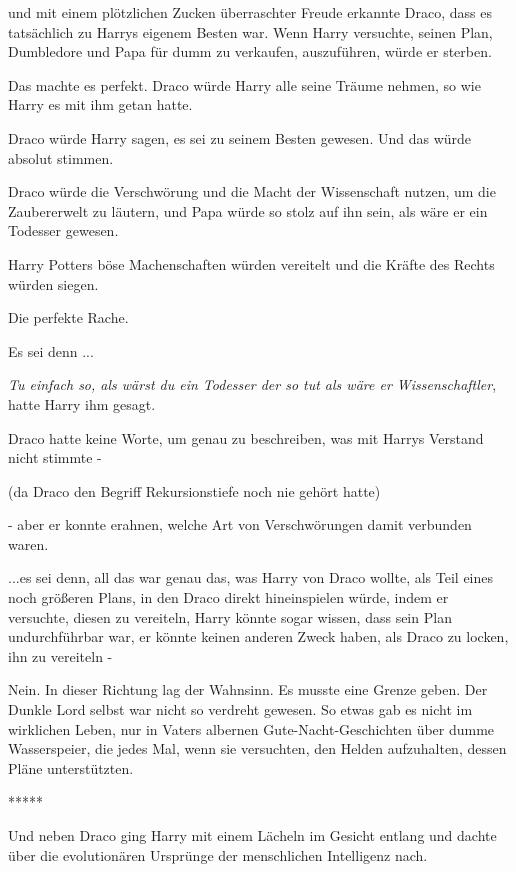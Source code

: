 und mit einem plötzlichen Zucken überraschter Freude erkannte Draco, dass es
tatsächlich zu Harrys eigenem Besten war. Wenn Harry versuchte, seinen Plan,
Dumbledore und Papa für dumm zu verkaufen, auszuführen, würde er sterben.

Das machte es perfekt. Draco würde Harry alle seine Träume nehmen, so wie Harry
es mit ihm getan hatte.

Draco würde Harry sagen, es sei zu seinem Besten gewesen. Und das würde absolut
stimmen.

Draco würde die Verschwörung und die Macht der Wissenschaft nutzen, um die
Zaubererwelt zu läutern, und Papa würde so stolz auf ihn sein, als wäre er ein
Todesser gewesen.

Harry Potters böse Machenschaften würden vereitelt und die Kräfte des Rechts
würden siegen.

Die perfekte Rache.

Es sei denn ...

\emph{Tu einfach so, als wärst du ein Todesser der so tut als wäre er
Wissenschaftler}, hatte Harry ihm gesagt.

Draco hatte keine Worte, um genau zu beschreiben, was mit Harrys Verstand nicht
stimmte -

(da Draco den Begriff \glqq{}Rekursionstiefe\grqq{} noch nie gehört hatte)

- aber er konnte erahnen, welche Art von Verschwörungen damit verbunden waren.

...es sei denn, all das war genau das, was Harry von Draco wollte, als Teil
eines noch größeren Plans, in den Draco direkt hineinspielen würde, indem er
versuchte, diesen zu vereiteln, Harry könnte sogar wissen, dass sein Plan
undurchführbar war, er könnte keinen anderen Zweck haben, als Draco zu locken,
ihn zu vereiteln -

Nein. In dieser Richtung lag der Wahnsinn. Es musste eine Grenze geben. Der
Dunkle Lord selbst war nicht so verdreht gewesen. So etwas gab es nicht im
wirklichen Leben, nur in Vaters albernen Gute-Nacht-Geschichten über dumme
Wasserspeier, die jedes Mal, wenn sie versuchten, den Helden aufzuhalten, dessen
Pläne unterstützten.

\begin{center}*****\end{center}

Und neben Draco ging Harry mit einem Lächeln im Gesicht entlang und dachte über
die evolutionären Ursprünge der menschlichen Intelligenz nach.

